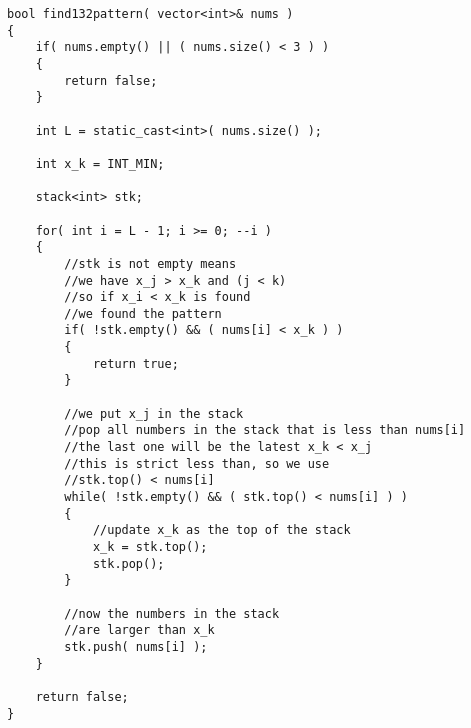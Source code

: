 \setcounter{lstlisting}{0}
\begin{lstlisting}[style=customc, caption={Stack}]
bool find132pattern( vector<int>& nums )
{
    if( nums.empty() || ( nums.size() < 3 ) )
    {
        return false;
    }

    int L = static_cast<int>( nums.size() );

    int x_k = INT_MIN;

    stack<int> stk;

    for( int i = L - 1; i >= 0; --i )
    {
        //stk is not empty means
        //we have x_j > x_k and (j < k)
        //so if x_i < x_k is found
        //we found the pattern
        if( !stk.empty() && ( nums[i] < x_k ) )
        {
            return true;
        }

        //we put x_j in the stack
        //pop all numbers in the stack that is less than nums[i]
        //the last one will be the latest x_k < x_j
        //this is strict less than, so we use
        //stk.top() < nums[i]
        while( !stk.empty() && ( stk.top() < nums[i] ) )
        {
            //update x_k as the top of the stack
            x_k = stk.top();
            stk.pop();
        }

        //now the numbers in the stack
        //are larger than x_k
        stk.push( nums[i] );
    }

    return false;
}
\end{lstlisting}